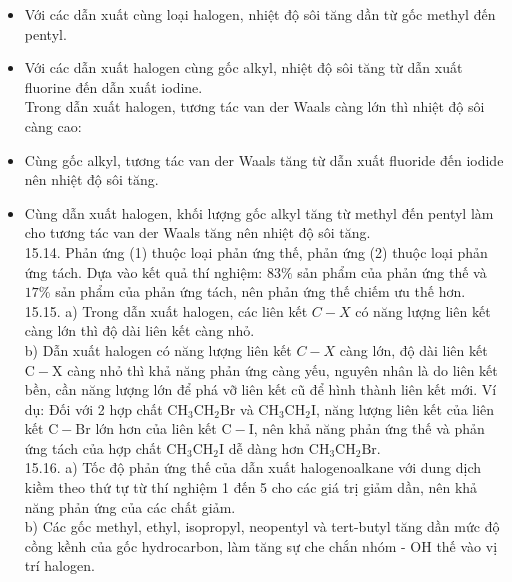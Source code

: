\documentclass[10pt]{article}
\begin{document}
\begin{itemize}
  \item Với các dẫn xuất cùng loại halogen, nhiệt độ sôi tăng dần từ gốc methyl đến pentyl.
  \item Với các dẫn xuất halogen cùng gốc alkyl, nhiệt độ sôi tăng từ dẫn xuất fluorine đến dẫn xuất iodine.\\
Trong dẫn xuất halogen, tương tác van der Waals càng lớn thì nhiệt độ sôi càng cao:
  \item Cùng gốc alkyl, tương tác van der Waals tăng từ dẫn xuất fluoride đến iodide nên nhiệt độ sôi tăng.
  \item Cùng dẫn xuất halogen, khối lượng gốc alkyl tăng từ methyl đến pentyl làm cho tương tác van der Waals tăng nên nhiệt độ sôi tăng.\\
15.14. Phản ứng (1) thuộc loại phản ứng thế, phản ứng (2) thuộc loại phản ứng tách. Dựa vào kết quả thí nghiệm: $83 \%$ sản phẩm của phản ứng thế và $17 \%$ sản phẩm của phản ứng tách, nên phản ứng thế chiếm ưu thế hơn.\\
15.15. a) Trong dẫn xuất halogen, các liên kết $C-X$ có năng lượng liên kết càng lớn thì độ dài liên kết càng nhỏ.\\
b) Dẫn xuất halogen có năng lượng liên kết $C-X$ càng lớn, độ dài liên kết $\mathrm{C}-\mathrm{X}$ càng nhỏ thì khả năng phản ứng càng yếu, nguyên nhân là do liên kết bền, cần năng lượng lớn để phá vỡ liên kết cũ để hình thành liên kết mới. Ví dụ: Đối với 2 hợp chất $\mathrm{CH}_{3} \mathrm{CH}_{2} \mathrm{Br}$ và $\mathrm{CH}_{3} \mathrm{CH}_{2} \mathrm{I}$, năng lượng liên kết của liên kết $\mathrm{C}-\mathrm{Br}$ lớn hơn của liên kết $\mathrm{C}-\mathrm{I}$, nên khả năng phản ứng thế và phản ứng tách của hợp chất $\mathrm{CH}_{3} \mathrm{CH}_{2} \mathrm{I}$ dễ dàng hơn $\mathrm{CH}_{3} \mathrm{CH}_{2} \mathrm{Br}$.\\
15.16. a) Tốc độ phản ứng thế của dẫn xuất halogenoalkane với dung dịch kiềm theo thứ tự từ thí nghiệm 1 đến 5 cho các giá trị giảm dần, nên khả năng phản ứng của các chất giảm.\\
b) Các gốc methyl, ethyl, isopropyl, neopentyl và tert-butyl tăng dần mức độ cồng kềnh của gốc hydrocarbon, làm tăng sự che chắn nhóm - OH thế vào vị trí halogen.\\

\end{itemize}
\end{document}

